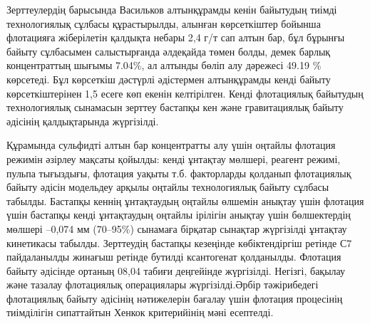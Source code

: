 
Зерттеулердің барысында Васильков алтынқұрамды кенін байытудың тиімді
технологиялық сұлбасы құрастырылды, алынған көрсеткіштер бойынша
флотацияға жіберілетін қалдықта небары 2,4 г/т сап алтын бар, бұл
бұрынғы байыту сұлбасымен салыстырғанда әлдеқайда төмен болды, демек
барлық концентраттың шығымы 7.04\%, ал алтынды бөліп алу дәрежесі 49.19
\% көрсетеді. Бұл көрсеткіш дәстүрлі әдістермен алтынқұрамды кенді
байыту көрсеткіштерінен 1,5 есеге көп екенін келтірілген. Кенді
флотациялық байытудың технологиялық сынамасын зерттеу бастапқы кен және
гравитациялық байыту әдісінің қалдықтарында жүргізілді.

Құрамында сульфидті алтын бар концентратты алу үшін оңтайлы флотация
режимін әзірлеу мақсаты қойылды: кенді ұнтақтау мөлшері, реагент режимі,
пульпа тығыздығы, флотация уақыты т.б. факторларды қолданып флотациялық
байыту әдісін модельдеу арқылы оңтайлы технологиялық байыту сұлбасы
табылды. Бастапқы кеннің ұнтақтаудың оңтайлы өлшемін анықтау үшін
флотация үшін бастапқы кенді ұнтақтаудың оңтайлы ірілігін анықтау үшін
бөлшектердің мөлшері --0,074 мм (70--95\%) сынамаға бірқатар сынақтар
жүргізілді ұнтақтау кинетикасы табылды. Зерттеудің бастапқы кезеңінде
көбіктендіргіш ретінде С7 пайдаланылды жинағыш ретінде бутилді
ксантогенат қолданылды. Флотация байыту әдісінде ортаның 08,04 табиғи
деңгейінде жүргізілді. Негізгі, бақылау және тазалау флотациялық
операциялары жүргізілді.Әрбір тәжірибедегі флотациялық байыту әдісінің
нәтижелерін бағалау үшін флотация процесінің тиімділігін сипаттайтын
Хенкок критерийінің мәні есептелді.

